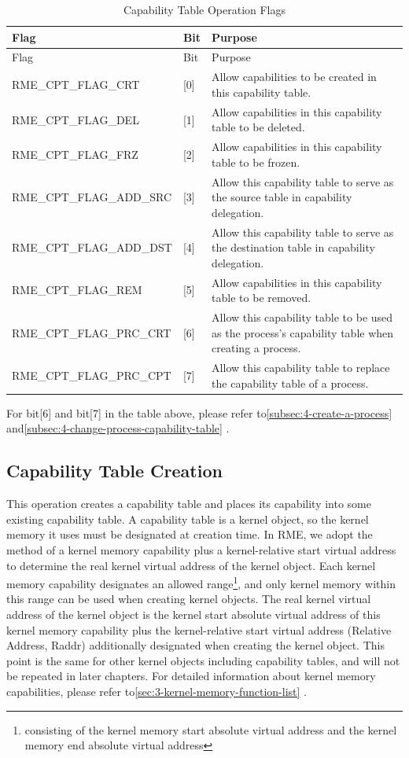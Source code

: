 \begin{xltabular}{\textwidth}{@{}>{\hsize\raggedright\arraybackslash}X>{\hsize\raggedright\arraybackslash}X>{\hsize\raggedright\arraybackslash}X@{}}
\caption{Capability Table Operation Flags}\label{tab:2-4-capability-table-operation-flags}\\
\toprule
Flag & Bit & Purpose\tabularnewline
\endfirsthead
\toprule
Flag & Bit & Purpose\tabularnewline
\midrule
\endhead
\bottomrule
\endlastfoot
RME\_CPT\_FLAG\_CRT & {[}0{]} &
Allow capabilities to be created in this capability table.\tabularnewline
RME\_CPT\_FLAG\_DEL & {[}1{]} &
Allow capabilities in this capability table to be deleted.\tabularnewline
RME\_CPT\_FLAG\_FRZ & {[}2{]} &
Allow capabilities in this capability table to be frozen.\tabularnewline
RME\_CPT\_FLAG\_ADD\_SRC & {[}3{]} &
Allow this capability table to serve as the source table in capability delegation.\tabularnewline
RME\_CPT\_FLAG\_ADD\_DST & {[}4{]} &
Allow this capability table to serve as the destination table in capability delegation.\tabularnewline
RME\_CPT\_FLAG\_REM & {[}5{]} &
Allow capabilities in this capability table to be removed.\tabularnewline
RME\_CPT\_FLAG\_PRC\_CRT & {[}6{]} &
Allow this capability table to be used as the process's capability table when creating a process.\tabularnewline
RME\_CPT\_FLAG\_PRC\_CPT & {[}7{]} &
Allow this capability table to replace the capability table of a process.\tabularnewline
\end{xltabular}
\nopagebreak[4]

For bit{[}6{]} and bit{[}7{]} in the table above, please refer to\ref{subsec:4-create-a-process}
and\ref{subsec:4-change-process-capability-table}
.

\subsection{Capability Table Creation}\label{subsec:2-create-a-capability-table}

This operation creates a capability table and places its capability into some existing capability table. A capability table is a kernel object, so the kernel memory it uses must be designated at creation time. In RME, we adopt the method of a kernel memory capability plus a kernel-relative start virtual address to determine the real kernel virtual address of the kernel object. Each kernel memory capability designates an allowed range\footnote{consisting of the kernel memory start absolute virtual address and the kernel memory end absolute virtual address}, and only kernel memory within this range can be used when creating kernel objects. The real kernel virtual address of the kernel object is the kernel start absolute virtual address of this kernel memory capability plus the kernel-relative start virtual address (Relative
Address,
Raddr) additionally designated when creating the kernel object. This point is the same for other kernel objects including capability tables, and will not be repeated in later chapters. For detailed information about kernel memory capabilities, please refer to\ref{sec:3-kernel-memory-function-list}
.

